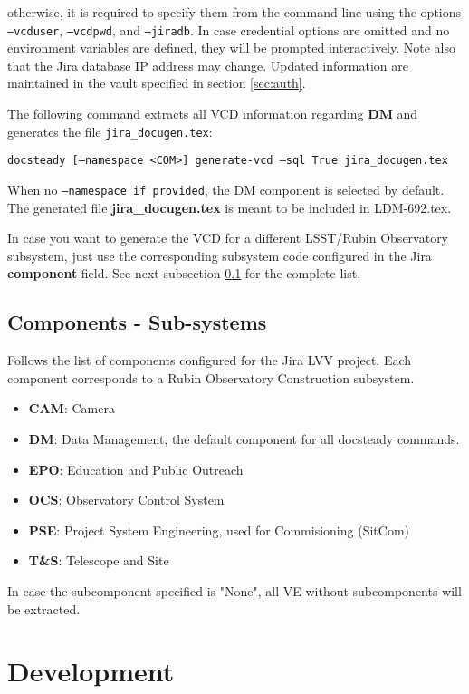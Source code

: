 otherwise, it is required to specify them from the command line using the options \texttt{--vcduser}, \texttt{--vcdpwd}, and \texttt{--jiradb}.
In case credential options are omitted and no environment variables are defined, they will be prompted interactively.
Note also that the Jira database IP address may change. Updated information are maintained in the vault specified in section \ref{sec:auth}.

The following command extracts all VCD information regarding \textbf{DM} and generates the file \texttt{jira\_docugen.tex}:

\texttt{docsteady [--namespace <COM>] generate-vcd --sql True jira\_docugen.tex}

When no \texttt{--namespace if provided}, the DM component is selected by default.
The generated file \textbf{jira\_docugen.tex} is meant to be included in LDM-692.tex.

In case you want to generate the VCD for a different LSST/Rubin Observatory subsystem,
just use the corresponding subsystem code configured in the Jira \textbf{component} field. 
See next subsection \ref{sec:components} for the complete list.


\subsection{Components - Sub-systems}\label{sec:components}

Follows the list of components configured for the Jira LVV project.
Each component corresponds to a Rubin Observatory Construction subsystem.

\begin{itemize}
\item \textbf{CAM}: Camera
\item \textbf{DM}: Data Management, the default component for all docsteady commands.
\item \textbf{EPO}: Education and Public Outreach
\item \textbf{OCS}: Observatory Control System
\item \textbf{PSE}: Project System Engineering, used for Commisioning (SitCom)
\item \textbf{T\&S}: Telescope and Site
\end{itemize}

In case the subcomponent specified is "None", all VE without subcomponents will be extracted.


\section{Development}
\label{sec:development}


